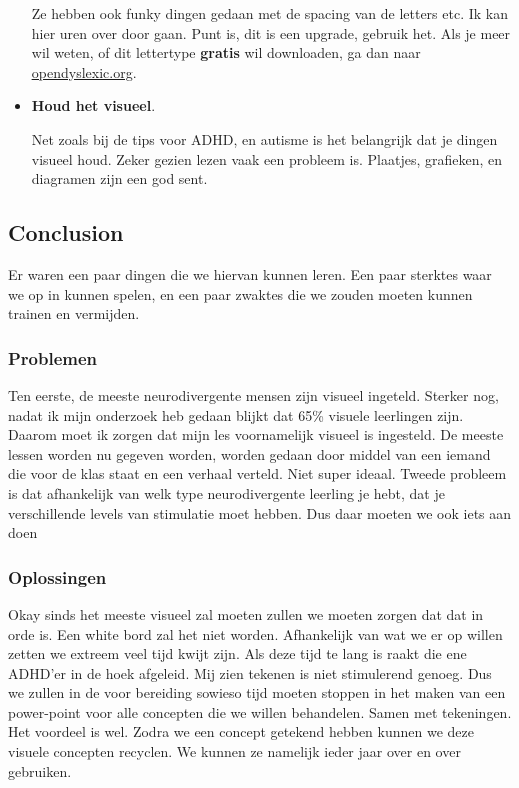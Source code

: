 \documentclass{article}
\begin{document}
\begin{itemize}
                            Ze hebben ook funky dingen gedaan met de spacing van de letters etc. Ik kan hier uren over door gaan. Punt is, dit is een upgrade, gebruik het. Als je meer wil weten, of dit lettertype \textbf{gratis} wil downloaden, ga dan naar \underline{\hyperlink{https://opendyslexic.org/}{opendyslexic.org}}.
                        
                        \item \textbf{Houd het visueel}. 
                            
                            Net zoals bij de tips voor ADHD, en autisme is het belangrijk dat je dingen visueel houd. Zeker gezien lezen vaak een probleem is. Plaatjes, grafieken, en diagramen zijn een god sent.

                    \end{itemize}
        
        \subsection{Conclusion}
            
            Er waren een paar dingen die we hiervan kunnen leren. Een paar sterktes waar we op in kunnen spelen, en een paar zwaktes die we zouden moeten kunnen trainen en vermijden.
        
        \subsubsection{Problemen}
            
            Ten eerste, de meeste neurodivergente mensen zijn visueel ingeteld. Sterker nog, nadat ik mijn onderzoek heb gedaan blijkt dat 65\% visuele leerlingen zijn.\cite{Visual-Learners-are-the-most-common} Daarom moet ik zorgen dat mijn les voornamelijk visueel is ingesteld. De meeste lessen worden nu gegeven worden, worden gedaan door middel van een iemand die voor de klas staat en een verhaal verteld. Niet super ideaal. Tweede probleem is dat afhankelijk van welk type neurodivergente leerling je hebt, dat je verschillende levels van stimulatie moet hebben. Dus daar moeten we ook iets aan doen
        
        \subsubsection{Oplossingen}
            
            Okay sinds het meeste visueel zal moeten zullen we moeten zorgen dat dat in orde is. Een white bord zal het niet worden. Afhankelijk van wat we er op willen zetten we extreem veel tijd kwijt zijn. Als deze tijd te lang is raakt die ene ADHD'er in de hoek afgeleid. Mij zien tekenen is niet stimulerend genoeg. Dus we zullen in de voor bereiding sowieso tijd moeten stoppen in het maken van een power-point voor alle concepten die we willen behandelen. Samen met tekeningen. Het voordeel is wel. Zodra we een concept getekend hebben kunnen we deze visuele concepten recyclen. We kunnen ze namelijk ieder jaar over en over gebruiken. 
            
\end{document}
